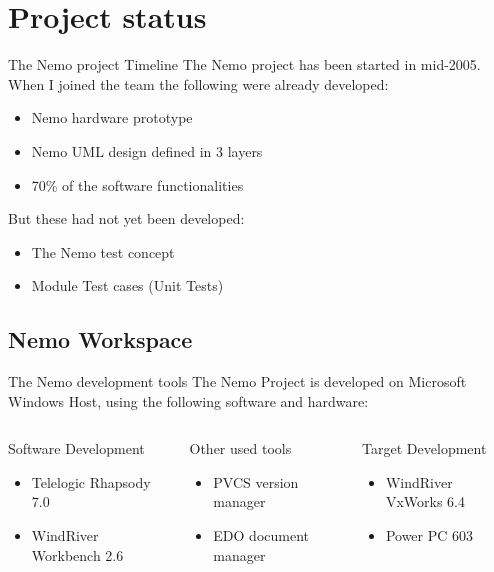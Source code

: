 \documentclass{beamer}
\begin{document}
\section{Project status}

\begin{frame}{The Nemo project Timeline}
The Nemo project has been started in mid-2005.\\
When I joined the team the following were already developed:
  \begin{itemize}
    \item
      Nemo hardware prototype
    \item
      Nemo UML design defined in 3 layers
    \item
      70\% of the software functionalities
  \end{itemize}

But these had not yet been developed:

\begin{itemize}
\item
  The Nemo test concept
\item
  Module Test cases (Unit Tests)
\end{itemize}

\end{frame}

\subsection{Nemo Workspace}
\begin{frame}{The Nemo development tools}
The Nemo Project is developed on Microsoft Windows Host, using the following
software and hardware:
\begin{columns}
	\begin{block}{Software Development}
	\begin{itemize}
		\item<1-> Telelogic Rhapsody 7.0
  		\item<2-> WindRiver Workbench 2.6
    \end{itemize}
    \end{block}

	\begin{block}{Other used tools}
	\begin{itemize}
      \item<3-> PVCS version manager
  	  \item<4-> EDO document manager
    \end{itemize}
    \end{block}

	\begin{block}{Target Development}
	\begin{itemize}
      \item<5->WindRiver VxWorks 6.4
  	  \item<6-> Power PC 603
    \end{itemize}
    \end{block}
\end{columns}
\end{frame}
\end{document}
